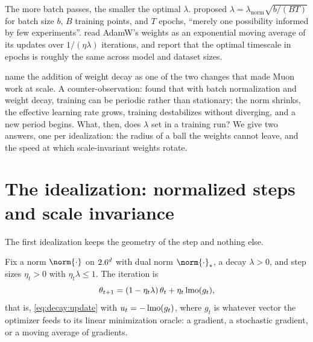\begin{refsection}
\begin{observation}\label{obs:decay:horizon}
The more batch passes, the smaller the optimal $\lambda$. \Textcite{LoshchilovHutter2019} proposed $\lambda=\lambda_{\mathrm{norm}}\sqrt{b/(BT)}$ for batch size $b$, $B$ training points, and $T$ epochs, ``merely one possibility informed by few experiments''. \Textcite{WangAitchison2025} read AdamW's weights as an exponential moving average of its updates over $1/(\eta\lambda)$ iterations, and report that the optimal timescale in epochs is roughly the same across model and dataset sizes.
\end{observation}

\Textcite{LiuEtAl2025Muon} name the addition of weight decay as one of the two changes that made Muon work at scale. A counter-observation: \textcite{LobachevaEtAl2021} found that with batch normalization and weight decay, training can be periodic rather than stationary; the norm shrinks, the effective learning rate grows, training destabilizes without diverging, and a new period begins. What, then, does $\lambda$ set in a training run? We give two answers, one per idealization: the radius of a ball the weights cannot leave, and the speed at which scale-invariant weights rotate.

\section{The idealization: normalized steps and scale invariance}\label{sec:decay:idealization}

The first idealization keeps the geometry of the step and nothing else.

\begin{assumption}\label{ass:decay:nsd}
Fix a norm $\norm{\cdot}$ on $2.6^d$ with dual norm $\norm{\cdot}_*$, a decay $\lambda>0$, and step sizes $\eta_t>0$ with $\eta_t\lambda\le1$. The iteration is
\[
  \theta_{t+1}=(1-\eta_t\lambda)\,\theta_t+\eta_t\operatorname{lmo}(g_t),
\]
that is, \eqref{eq:decay:update} with $u_t=-\operatorname{lmo}(g_t)$, where $g_t$ is whatever vector the optimizer feeds to its linear minimization oracle: a gradient, a stochastic gradient, or a moving average of gradients.
\end{assumption}


\end{refsection}
